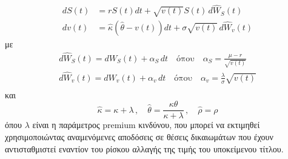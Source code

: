 \documentclass[12pt,a4paper,twoside,openany]{book}
\begin{document}
 	\begin{align*}
 		dS(t) &= r S(t)dt + \sqrt{v(t)} S(t)\, d\widehat{W}_S(t)   \\
 		dv(t) &= \widehat{\kappa} (\widehat{\theta} - v(t))dt + \sigma\sqrt{v(t)}\, d\widehat{W}_v(t)  
 	\end{align*}
 	με 
 	\begin{align*}
 		d\widehat{W}_S(t) = dW_S(t) + \alpha_S \,dt \quad\text{όπου}\quad \alpha_S=\frac{\mu-r}{\sqrt{v(t)}}  \\
 		d\widehat{W}_v(t) = dW_v(t) + \alpha_v \,dt \quad\text{όπου}\quad \alpha_v=\frac{\lambda}{\sigma}\sqrt{v(t)} \\
 	\end{align*}
 	και
 	\[\widehat{\kappa} = \kappa +\lambda\,, \quad \widehat{\theta} = \frac{\kappa\theta}{\kappa+\lambda} \,, \quad \widehat{\rho}= \rho  \]
 	όπου $\lambda$ είναι η παράμετρος premium κινδύνου, που μπορεί να εκτιμηθεί χρησιμοποιώντας αναμενόμενες αποδόσεις σε θέσεις δικαιωμάτων που έχουν αντισταθμιστεί εναντίον του ρίσκου αλλαγής της τιμής του υποκείμενου τίτλου.\\
 	
\end{document}
